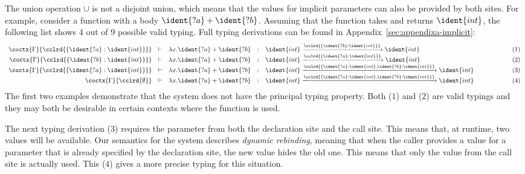 The union operation $\cup$ is not a disjoint union, which means that the values for implicit
parameters can also be provided by both sites. For example, consider a function with a body
$\ident{?a} + \ident{?b}$. Assuming that the function takes and returns $\ident{int}$, the following
list shows 4 out of 9 possible valid typing. Full typing derivations can be found in Appendix~\ref{sec:appendixa-implicit}:
%
\label{pg:applications-flat-paramsex}
\begin{equation*}
\begin{array}{rcllllr}
\coctx{\Gamma}{\cclrd{ \{ \ident{?a}:\ident{int} \} }} &\vdash& \lambda x.\ident{?a} + \ident{?b} &:&
  \ident{int} \xrightarrow{\cclrd{ \{ \ident{?b}:\ident{int} \} }} \ident{int} &\qquad\qquad&(1) \\
\coctx{\Gamma}{\cclrd{ \{ \ident{?b}:\ident{int} \} }} &\vdash& \lambda x.\ident{?a} + \ident{?b} &:&
  \ident{int} \xrightarrow{\cclrd{ \{ \ident{?a}:\ident{int} \} }} \ident{int} &&(2)\\
\coctx{\Gamma}{\cclrd{ \{\ident{?a}:\ident{int} \} }} &\vdash& \lambda x.\ident{?a} + \ident{?b} &:&
  \ident{int} \xrightarrow{\cclrd{ \{\ident{?a}:\ident{int}, \ident{?b}:\ident{int} \} }} \ident{int} &&(3)\\
\coctx{\Gamma}{\cclrd{ \emptyset }} &\vdash& \lambda x.\ident{?a} + \ident{?b} &:&
  \ident{int} \xrightarrow{\cclrd{ \{\ident{?a}:\ident{int}, \ident{?b}:\ident{int} \} }} \ident{int} &&(4)
\end{array}
\end{equation*}
%
The first two examples demonstrate that the system does not have the principal typing property.
Both ($1$) and ($2$) are valid typings and they may both be desirable in certain contexts where
the function is used.

The next typing derivation ($3$) requires the parameter  from both the declaration site and
the call site. This means that, at runtime, two values will be available. Our semantics for the
system describes \emph{dynamic rebinding}, meaning that when the caller provides a value for a
parameter that is already specified by the declaration site, the new value hides the old one. This
means that only the value from the call site is actually used. This ($4$) gives a more precise
typing for this situation.


